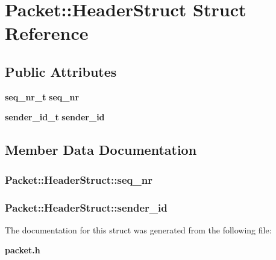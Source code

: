 \section{Packet::Header\-Struct Struct Reference}
\label{structPacket_1_1HeaderStruct}
\subsection*{Public Attributes}
\begin{CompactItemize}
\item 
{\bf seq\_\-nr\_\-t} {\bf seq\_\-nr}
\item 
{\bf sender\_\-id\_\-t} {\bf sender\_\-id}
\end{CompactItemize}


\subsection{Member Data Documentation}
\subsubsection{ {\bf Packet::Header\-Struct::seq\_\-nr}}\label{structPacket_1_1HeaderStruct_4b7b9bf68b204ca98171b7f818685521}


\subsubsection{ {\bf Packet::Header\-Struct::sender\_\-id}}\label{structPacket_1_1HeaderStruct_c129b7cda1d848a579b689bacdabddea}




The documentation for this struct was generated from the following file:\begin{CompactItemize}
\item 
{\bf packet.h}\end{CompactItemize}
